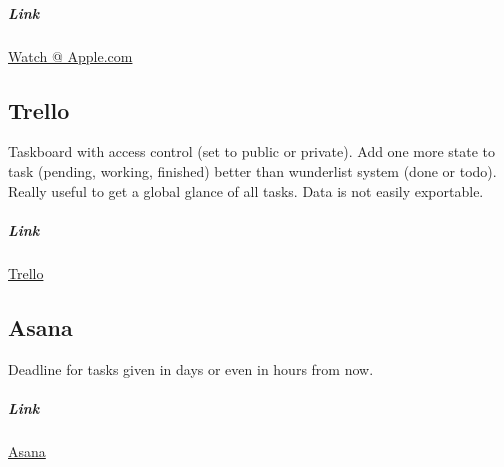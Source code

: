 \subparagraph{Link} \href{https://www.apple.com/watch/}{Watch @ Apple.com}

\subsection{Trello}

\begin{itemize}
\adv Taskboard with access control (set to public or private).
\adv Add one more state to task (pending, working, finished) better than wunderlist system (done or todo).
\adv Really useful to get a global glance of all tasks.
\dsv Data is not easily exportable.
\end{itemize}
\subparagraph{Link} \href{http://trello.com}{Trello}

\subsection{Asana}
\begin{itemize}
\adv Deadline for tasks given in days or even in hours from now.
\end{itemize}

\subparagraph{Link} \href{http://asana.com}{Asana}
